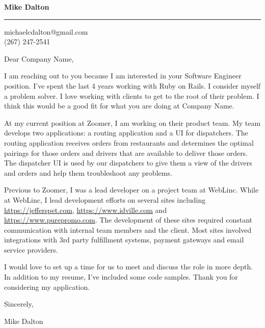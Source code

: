 \documentclass{letter} %
\newcommand{\companyName}{Company Name}
\begin{document}

\begin{flushleft}
{\large\bf Mike Dalton}
\end{flushleft}
\medskip\hrule height 1pt
\begin{flushright}
\hfill michaelcdalton@gmail.com \\
\hfill (267) 247-2541
\end{flushright}

Dear \companyName{},

I am reaching out to you because I am interested in your Software Engineer position. I've spent the last 4 years working with Ruby on Rails. I consider myself a problem solver. I love working with clients to get to the root of their problem. I think this would be a good fit for what you are doing at \companyName{}.

At my current position at Zoomer, I am working on their product team. My team develops two applications: a routing application and a UI for dispatchers. The routing application receives orders from restaurants and determines the optimal pairings for those orders and drivers that are available to deliver those orders. The dispatcher UI is used by our dispatchers to give them a view of the drivers and orders and help them troubleshoot any problems.

Previous to Zoomer, I was a lead developer on a project team at WebLinc. While at WebLinc, I lead development efforts on several sites including \url{https://jefferspet.com}, \url{https://www.idville.com} and \url{https://www.purepromo.com}. The development of these sites required constant communication with internal team members and the client. Most sites involved integrations with 3rd party fulfillment systems, payment gateways and email service providers.

I would love to set up a time for us to meet and discuss the role in more depth. In addition to my resume, I've included some code samples. Thank you for considering my application.

Sincerely,

Mike Dalton
\end{document}
